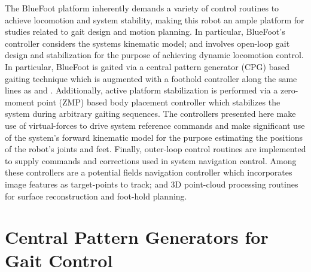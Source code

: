 		The BlueFoot platform inherently demands a variety of control routines to achieve locomotion and system stability, making this robot an ample platform for studies related to gait design and motion planning. In particular, BlueFoot's controller considers the systems kinematic model; and involves open-loop gait design and stabilization for the purpose of achieving dynamic locomotion control. In particular, BlueFoot is gaited via a central pattern generator (CPG) based gaiting technique which is augmented with a foothold controller along the same lines as \cite{Ajallooeian2013} and \cite{Rutishauser2008}. Additionally, active platform stabilization is performed via a zero-moment point (ZMP) based body placement controller which stabilizes the system during arbitrary gaiting sequences. The controllers presented here make use of virtual-forces to drive system reference commands and make significant use of the system's forward kinematic model for the purpose estimating the positions of the robot's joints and feet. Finally, outer-loop control routines are implemented to supply commands and corrections used in system navigation control. Among these controllers are a potential fields navigation controller which incorporates image features as target-points to track; and 3D point-cloud processing routines for surface reconstruction and foot-hold planning.

		\section{Central Pattern Generators for Gait Control}

